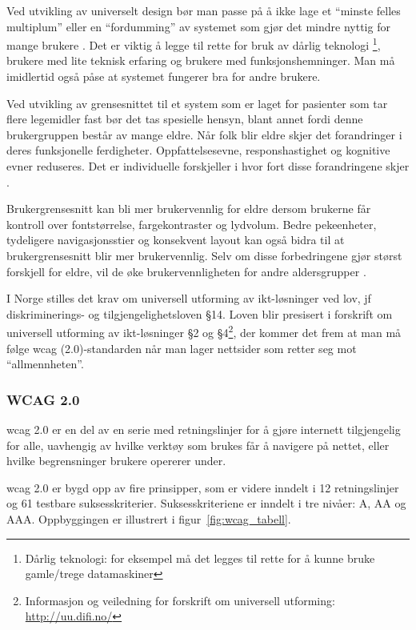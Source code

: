 Ved utvikling av universelt design bør man passe på å ikke lage et “minste felles multiplum” eller en “fordumming” av systemet som gjør det mindre nyttig for mange brukere \citep{MMIboken25}. Det er viktig å legge til rette for bruk av dårlig teknologi \footnote{Dårlig teknologi: for eksempel må det legges til rette for å kunne bruke gamle/trege datamaskiner}, brukere med lite teknisk erfaring og brukere med funksjonshemninger. Man må imidlertid også påse at systemet fungerer bra for andre brukere.

Ved utvikling av grensesnittet til et system som er laget for pasienter som tar flere legemidler fast bør det tas spesielle hensyn, blant annet fordi denne brukergruppen består av mange eldre. Når folk blir eldre skjer det forandringer i deres funksjonelle ferdigheter. Oppfattelsesevne, responshastighet og kognitive evner reduseres. Det er individuelle forskjeller i hvor fort disse forandringene skjer \citep{designForGamlisser}. 

Brukergrensesnitt kan bli mer brukervennlig for eldre dersom brukerne får kontroll over fontstørrelse, fargekontraster og lydvolum. Bedre pekeenheter, tydeligere navigasjonsstier og konsekvent layout kan også bidra til at brukergrensesnitt blir mer brukervennlig. Selv om disse forbedringene gjør størst forskjell for eldre, vil de øke brukervennligheten for andre aldersgrupper \citep{designForGamlisser}.

I Norge stilles det krav om universell utforming av \acrshort{ikt}-løsninger ved lov, jf diskriminerings- og tilgjengelighetsloven §14. Loven blir presisert i forskrift om universell utforming av \acrshort{ikt}-løsninger §2 og §4\footnote{Informasjon og veiledning for forskrift om universell utforming: \url{http://uu.difi.no/}}, der kommer det frem at man må følge \acrshort{wcag} (2.0)-standarden når man lager nettsider som retter seg mot “allmennheten”. 

\subsubsection{WCAG 2.0}
\acrfull{wcag} 2.0 er en del av en serie med retningslinjer for å gjøre internett tilgjengelig for alle, uavhengig av hvilke verktøy som brukes får å navigere på nettet, eller hvilke begrensninger brukere opererer under. 

\acrshort{wcag} 2.0 er bygd opp av fire prinsipper, som er videre inndelt i 12 retningslinjer og 61 testbare suksesskriterier. Suksesskriteriene er inndelt i tre nivåer: A, AA og AAA. Oppbyggingen er illustrert i figur~\ref{fig:wcag_tabell}.

